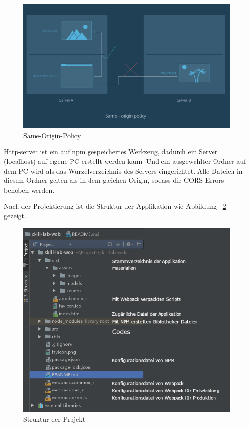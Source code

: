 \begin{figure}[ht]
\centering
\includegraphics[width=\textwidth]{images/sameOrigin.png}
\caption[Same-Origin-Policy]{Same-Origin-Policy}
\label{fig:Same-Origin-Policy}
\end{figure}
 
 Http-server ist ein auf npm gespeichertes Werkzeug, dadurch ein Server (localhost) auf eigene PC erstellt werden kann. Und ein ausgewählter Ordner auf dem PC wird als das Wurzelverzeichnis des Servers eingerichtet. Alle Dateien in diesem Ordner gelten als in dem gleichen Origin, sodass die CORS Errors behoben werden.
 
 Nach der Projektierung ist die Struktur der Applikation wie Abbildung ~\ref{fig:projektStruktur} gezeigt.
 
\begin{figure}[ht]
\centering
\includegraphics[width=\textwidth]{images/projektSturktur.png}
\caption[Struktur der Projekt]{Struktur der Projekt}
\label{fig:projektStruktur} 
\end{figure}
 
